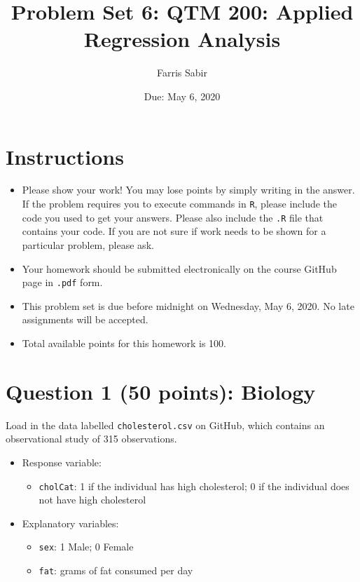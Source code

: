 \documentclass[12pt,letterpaper]{article}
\title{Problem Set 6: QTM 200: Applied Regression Analysis}
\date{Due: May 6, 2020}
\author{Farris Sabir}
\begin{document}
	\maketitle
	
	\section*{Instructions}
	\begin{itemize}
		\item Please show your work! You may lose points by simply writing in the answer. If the problem requires you to execute commands in \texttt{R}, please include the code you used to get your answers. Please also include the \texttt{.R} file that contains your code. If you are not sure if work needs to be shown for a particular problem, please ask.
		\item Your homework should be submitted electronically on the course GitHub page in \texttt{.pdf} form.
		\item This problem set is due before midnight on Wednesday, May 6, 2020. No late assignments will be accepted.
		\item Total available points for this homework is 100.
	\end{itemize}
	
	\vspace{.5cm}
\section*{Question 1 (50 points): Biology}
\vspace{.25cm}
\noindent Load in the data labelled \texttt{cholesterol.csv} on GitHub, which contains an observational study of 315 observations.
  
\begin{itemize}
	\item
	Response variable: 
	\begin{itemize}
		\item \texttt{cholCat}: 1 if the individual has high cholesterol; 0 if the individual does not have high cholesterol
	\end{itemize}
	\item
	Explanatory variables: 
	\begin{itemize}
		\item
		\texttt{sex}: 1 Male; 0 Female
		\item
		\texttt{fat}: grams of fat consumed per day
		
	\end{itemize}
	
\end{itemize}
\end{document}
